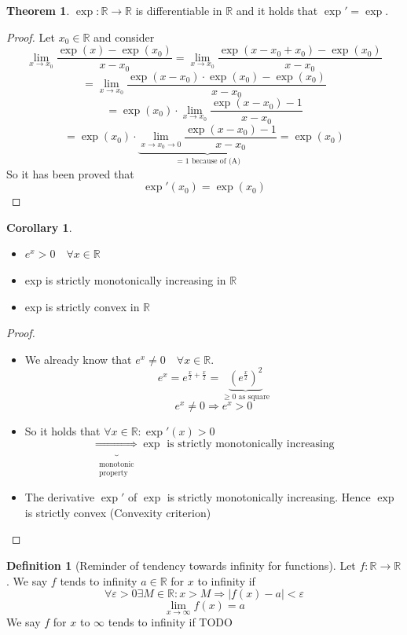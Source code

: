 \documentclass[a4paper,landscape,twocolumn]{article}
\theoremstyle{definition}
\newtheorem{theorem}{Theorem}
\newtheorem{defi}{Definition}
\newtheorem{cor}{Corollary}
\newcommand\abs[1]{\left|#1\right|}
\begin{document}
\begin{theorem}
  $\exp: \mathbb R \to \mathbb R$ is differentiable in $\mathbb R$ and it holds that
  $\exp' = \exp$.
\end{theorem}
\begin{proof}
  Let $x_0 \in \mathbb R$ and consider
  \[
    \lim_{x \to x_0} \frac{\exp(x) - \exp(x_0)}{x - x_0}
    = \lim_{x \to x_0} \frac{\exp(x - x_0 + x_0) - \exp(x_0)}{x - x_0}
  \] \[
    = \lim_{x \to x_0} \frac{\exp(x - x_0) \cdot \exp(x_0) - \exp(x_0)}{x - x_0}
  \] \[
    = \exp(x_0) \cdot \lim_{x \to x_0} \frac{\exp(x - x_0) - 1}{x - x_0}
  \] \[
    = \exp(x_0) \cdot \underbrace{\lim_{x \to x_0 \to 0} \frac{\exp(x - x_0) - 1}{x - x_0}}_{= 1 \text{ because of (A)}}
    = \exp(x_0)
  \]
  So it has been proved that
  \[ \exp'(x_0) = \exp(x_0) \]
\end{proof}
%
\begin{cor}
  \begin{itemize}
    \item $e^x > 0 \quad \forall x \in \mathbb R$
    \item exp is strictly monotonically increasing in $\mathbb R$
    \item exp is strictly convex in $\mathbb R$
  \end{itemize}
\end{cor}
\begin{proof}
  \begin{itemize}
    \item
      We already know that $e^x \neq 0 \quad \forall x \in \mathbb R$.
      \[ e^x = e^{\frac x2 + \frac x2} = \underbrace{\left(e^{\frac x2}\right)^2}_{\geq 0 \text{ as square}} \]
      \[ e^x \neq 0 \Rightarrow e^x > 0 \]
    \item
      So it holds that $\forall x \in \mathbb R: \exp'(x) > 0$
      \[
        \underbrace{\Rightarrow}_{\substack{\text{monotonic} \\ \text{property}}}
        \exp \text{ is strictly monotonically increasing}
      \]
    \item
      The derivative $\exp'$ of $\exp$ is strictly monotonically increasing.
      Hence $\exp$ is strictly convex (Convexity criterion)
  \end{itemize}
\end{proof}
\begin{defi}[Reminder of tendency towards infinity for functions]
  Let $f: \mathbb R \to \mathbb R$. We say $f$ tends to infinity $a \in \mathbb R$
  for $x$ to infinity if
  \[ \forall \varepsilon > 0 \exists M \in \mathbb R: x > M \Rightarrow \abs{f(x) - a} < \varepsilon \]
  \[ \lim_{x \to \infty} f(x) = a \]
  We say $f$ for $x$ to $\infty$ tends to infinity if
  TODO
\end{defi}
\end{document}
